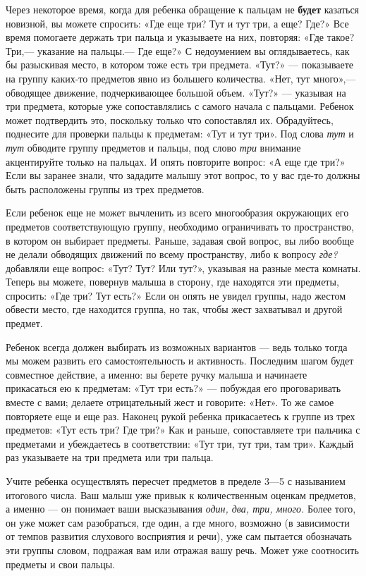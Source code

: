 \documentclass[a5paper]{book}
\renewcommand{\emph}[1]{\textit{#1}}
\begin{document}
Через некоторое время, когда для ребенка обращение к пальцам не
\textbf{будет} казаться новизной, вы можете спросить: «Где еще три? Тут
и тут три, а еще? Где?» Все время помогаете держать три пальца и
указываете на них, повторяя: «Где такое? Три,--- указание на пальцы.---
Где еще?» С недоумением вы оглядываетесь, как бы разыскивая место, в
котором тоже есть три предмета. «Тут?» --- показываете на группу
каких-то предметов явно из большего количества. «Нет, тут много»,---
обводящее движение, подчеркивающее большой объем. «Тут?» --- указывая на
три предмета, которые уже сопоставлялись с самого начала с пальцами.
Ребенок может подтвердить это, поскольку только что сопоставлял их.
Обрадуйтесь, поднесите для проверки пальцы к предметам: «Тут и тут три».
Под слова \emph{тут} и \emph{тут} обводите группу предметов и пальцы,
под слово \emph{три} внимание акцентируйте только на пальцах. И опять
повторите вопрос: «А еще где три?» Если вы заранее знали, что зададите
малышу этот вопрос, то у вас где-то должны быть расположены группы из
трех предметов.

Если ребенок еще не может вычленить из всего многообразия окружающих его
предметов соответствующую группу, необходимо ограничивать то
пространство, в котором он выбирает предметы. Раньше, задавая свой
вопрос, вы либо вообще не делали обводящих движений по всему
пространству, либо к вопросу \emph{где?} добавляли еще вопрос: «Тут?
Тут? Или тут?», указывая на разные места комнаты. Теперь вы можете,
повернув малыша в сторону, где находятся эти предметы, спросить: «Где
три? Тут есть?» Если он опять не увидел группы, надо жестом обвести
место, где находится группа, но так, чтобы жест захватывал и другой
предмет.

Ребенок всегда должен выбирать из возможных вариантов --- ведь только
тогда мы можем развить его самостоятельность и активность. Последним
шагом будет совместное действие, а именно: вы берете ручку малыша и
начинаете прикасаться ею к предметам: «Тут три есть?» --- побуждая его
проговаривать вместе с вами; делаете отрицательный жест и говорите:
«Нет». То же самое повторяете еще и еще раз. Наконец рукой ребенка
прикасаетесь к группе из трех предметов: «Тут есть три? Где три?» Как и
раньше, сопоставляете три пальчика с предметами и убеждаетесь в
соответствии: «Тут три, тут три, там три». Каждый раз указываете на три
предмета или три пальца.

Учите ребенка осуществлять пересчет предметов в пределе 3---5 с
называнием итогового числа. Ваш малыш уже привык к количественным
оценкам предметов, а именно --- он понимает ваши высказывания
\emph{один, два, три, много.} Более того, он уже может сам разобраться,
где один, а где много, возможно (в зависимости от темпов развития
слухового восприятия и речи), уже сам пытается обозначать эти группы
словом, подражая вам или отражая вашу речь. Может уже соотносить
предметы и свои пальцы.
\end{document}
